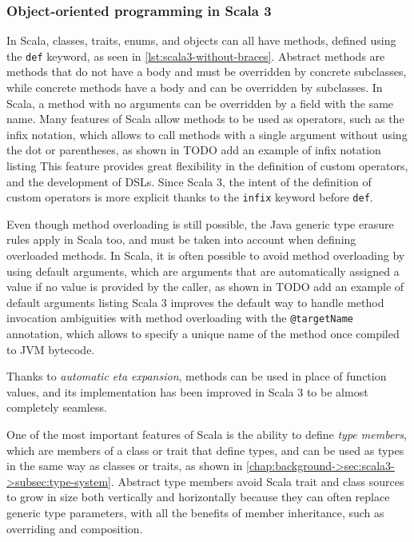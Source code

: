

\subsubsection{Object-oriented programming in Scala 3}

In Scala, classes, traits, enums, and objects can all have methods, defined using the \texttt{def} keyword, as seen in \cref{lst:scala3-without-braces}.
%
Abstract methods are methods that do not have a body and must be overridden by concrete subclasses, while concrete methods have a body and can be overridden by subclasses.
%
In Scala, a method with no arguments can be overridden by a field with the same name.
%
Many features of Scala allow methods to be used as operators, such as the infix notation, which allows to call methods with a single argument without using the dot or parentheses, as shown in 
TODO add an example of infix notation listing
%
This feature provides great flexibility in the definition of custom operators, and the development of \ac{DSL}s.
%
Since Scala 3, the intent of the definition of custom operators is more explicit thanks to the \texttt{infix} keyword before \texttt{def}.

Even though method overloading is still possible, the Java generic type erasure rules apply in Scala too, and must be taken into account when defining overloaded methods.
%
In Scala, it is often possible to avoid method overloading by using default arguments, which are arguments that are automatically assigned a value if no value is provided by the caller, as shown in
TODO add an example of default arguments listing
%
Scala 3 improves the default way to handle method invocation ambiguities with method overloading with the \texttt{@targetName} annotation, which allows to specify a unique name of the method once compiled to \ac{JVM} bytecode.

Thanks to \textit{automatic eta expansion}, methods can be used in place of function values, and its implementation has been improved in Scala 3 to be almost completely seamless.

One of the most important features of Scala is the ability to define \textit{type members},
which are members of a class or trait that define types, and can be used as types in the same way as classes or traits, as shown in \cref{chap:background->sec:scala3->subsec:type-system}.
%
Abstract type members avoid Scala trait and class sources to grow in size both vertically and horizontally because they can often replace generic type parameters, with all the benefits of member inheritance, such as overriding and composition.

